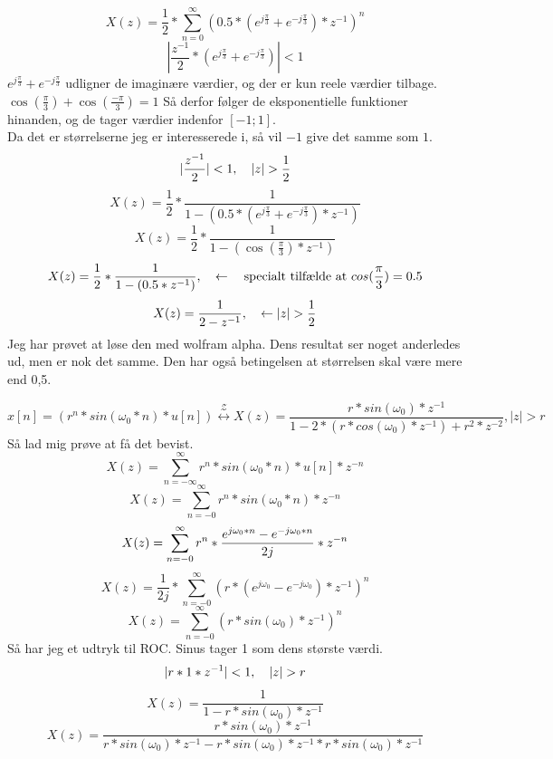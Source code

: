 \begin{Opgaver}
\begin{kapitel}[Z transformation]
\begin{Opgave}
\begin{UnderOpgave}[\text{$x[n] = (1/2)^n * cos(\pi * n/3)*u[n]$}, forkert]
                \[X(z) = \frac{1}{2} * \sum_{n=0}^{\infty}{(0.5 * (e^{j\frac{\pi}{3}} + e^{-j\frac{\pi}{3}}) * z^{-1})^n }\]
                \[|\frac{z^{-1}}{2} * (e^{j\frac{\pi}{3}} + e^{-j\frac{\pi}{3}})| < 1\]
                $e^{j\frac{\pi}{3}} + e^{-j\frac{\pi}{3}}$ udligner de imaginære værdier, og der er kun reele værdier tilbage. $\cos(\frac{\pi}{3}) + \cos(\frac{-\pi}{3}) = 1$
                Så derfor følger de eksponentielle funktioner hinanden, og de tager værdier indenfor $[-1; 1]$.\\
                Da det er størrelserne jeg er interesserede i, så vil $-1$ give det samme som $1$.\\
                \[|\frac{z^{-1}}{2}| < 1, \tab{0} |z| > \frac{1}{2}\]
                \[X(z) = \frac{1}{2} * \frac{1}{1 - (0.5 * (e^{j\frac{\pi}{3}} + e^{-j\frac{\pi}{3}}) * z^{-1})}\]
                \[X(z) = \frac{1}{2} * \frac{1}{1 - (\cos(\frac{\pi}{3}) * z^{-1})}\]
                \[X(z) = \frac{1}{2} * \frac{1}{1 - (0.5 * z^{-1})}, \tab{0} \leftarrow \tab{0} \text{specialt tilfælde at } cos(\frac{\pi}{3}) = 0.5\]
                \[X(z) = \frac{1}{2 - z^{-1}},\tab{0} \leftarrow |z| > \frac{1}{2}\]
                Jeg har prøvet at løse den med wolfram alpha. Dens resultat ser noget anderledes ud, men er nok det samme. Den har også betingelsen at størrelsen skal være mere end 0,5.
            \end{UnderOpgave}
        \end{Opgave}
        \begin{Opgave}
            \[x[n] = (r^n * sin(\omega_0 * n)*u[n]) \overset{\mathscr{Z}}{\leftrightarrow} X(z) = \frac{r*sin(\omega_0)*z^{-1}}{1 - 2*(r*cos(\omega_0) * z^{-1}) + r^2*z^{-2}}, |z| > r\]
            Så lad mig prøve at få det bevist.
            \[X(z) = \sum_{n=-\infty}^{\infty}{r^n * sin(\omega_0 * n) * u[n] * z^{-n}}\]
            \[X(z) = \sum_{n=-0}^{\infty}{r^n * sin(\omega_0 * n) * z^{-n}}\]
            \[X(z) = \sum_{n=-0}^{\infty}{r^n * \frac{e^{j\omega_0 * n} - e^{-j\omega_0 * n}}{2j} * z^{-n}}\]
            \[X(z) = \frac{1}{2j} * \sum_{n=-0}^{\infty}{(r * (e^{j\omega_0} - e^{-j\omega_0}) * z^{-1})^n}\]
            \[X(z) = \sum_{n=-0}^{\infty}{(r * sin(\omega_0) * z^{-1})^n}\]
            Så har jeg et udtryk til ROC. Sinus tager 1 som dens største værdi. 
            \[|r * 1 * z^{-1}| < 1, \tab{0} |z| > r \]
            \[X(z) = {\frac{1}{1 - r * sin(\omega_0) * z^{-1}}}\]
            \[X(z) = {\frac{r * sin(\omega_0) * z^{-1}}{r * sin(\omega_0) * z^{-1} - r * sin(\omega_0) * z^{-1} * r * sin(\omega_0) * z^{-1}}}\]

\end{Opgave}
\end{kapitel}
\end{Opgaver}
